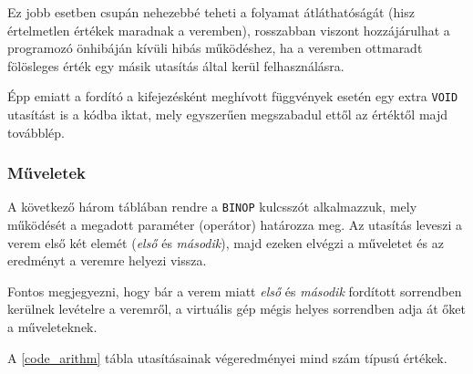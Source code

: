Ez jobb esetben csupán nehezebbé teheti a folyamat átláthatóságát (hisz értelmetlen értékek maradnak a veremben), rosszabban viszont hozzájárulhat a programozó önhibáján kívüli hibás működéshez, ha a veremben ottmaradt fölösleges érték egy másik utasítás által kerül felhasználásra.

Épp emiatt a fordító a kifejezésként meghívott függvények esetén egy extra \texttt{VOID} utasítást is a kódba iktat, mely egyszerűen megszabadul ettől az értéktől majd továbblép.

\subsubsection{Műveletek}

A következő három táblában rendre a \texttt{BINOP} kulcsszót alkalmazzuk, mely működését a megadott paraméter (operátor) határozza meg. Az utasítás leveszi a verem első két elemét (\textit{első} és \textit{második}), majd ezeken elvégzi a műveletet és az eredményt a veremre helyezi vissza.

Fontos megjegyezni, hogy bár a verem miatt \textit{első} és \textit{második} fordított sorrendben kerülnek levételre a veremről, a virtuális gép mégis helyes sorrendben adja át őket a műveleteknek.


A \ref{code_arithm} tábla utasításainak végeredményei mind szám típusú értékek.


